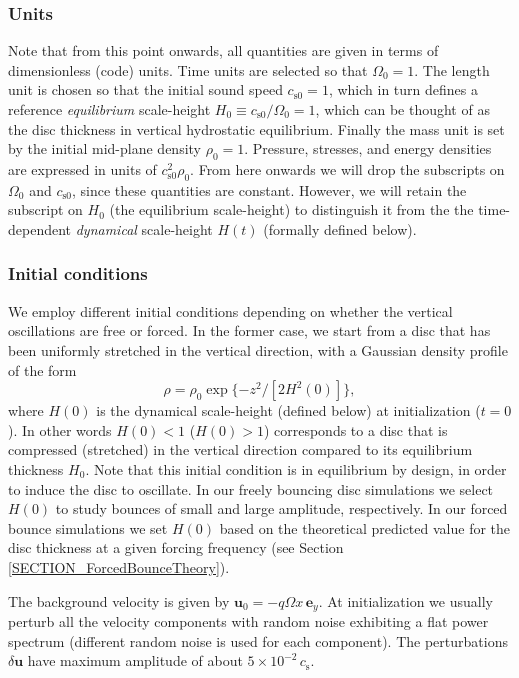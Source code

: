 \documentclass[fleqn,usenatbib]{mnras}
\begin{document}
\subsubsection{Units}
\label{METHODS_Units}
Note that from this point onwards, all quantities are given in terms of dimensionless (code) units. Time units are selected so that $\Omega_0 = 1$. The length unit is chosen so that the initial sound speed $c_{\text{s}0} = 1$, which in turn defines a reference \textit{equilibrium} scale-height $H_0\equiv c_{\text{s}0} / \Omega_0=1$, which can be thought of as the disc thickness in vertical hydrostatic equilibrium. Finally the mass unit is set by the initial mid-plane density $\rho_0 = 1$. Pressure, stresses, and energy densities are expressed in units of $c_{\text{s}0}^2 \rho_0$. From here onwards we will drop the subscripts on $\Omega_0$ and $c_{\text{s}0}$, since these quantities are constant. However, we will retain the subscript on $H_0$ (the equilibrium scale-height) to distinguish it from the the time-dependent \textit{dynamical} scale-height $H(t)$ (formally defined below).

\subsubsection{Initial conditions}
\label{METHODS_InitialConditions}
We employ different initial conditions depending on whether the vertical oscillations are free or forced. In the former case, we start from a disc that has been uniformly stretched in the vertical direction, with a Gaussian density profile of the form
\begin{equation}
\rho = \rho_0 \exp{\{-z^2/[2H^2(0)]\}},
\label{EQUN_densityprofile}
\end{equation}
where $H(0)$ is the dynamical scale-height (defined below) at initialization ($t=0$). In other words $H(0)<1$ ($H(0)>1$) corresponds to a disc that is compressed (stretched) in the vertical direction compared to its equilibrium thickness $H_0$. Note that this initial condition is  in equilibrium by design, in order to induce the disc to oscillate. In our freely bouncing disc simulations we select $H(0)$ to study bounces of small and large amplitude, respectively. In our forced bounce simulations we set $H(0)$ based on the theoretical predicted value for the disc thickness at a given forcing frequency (see Section \ref{SECTION_ForcedBounceTheory}).

The background velocity is given by $\mathbf{u}_0 = -q \Omega x \,\mathbf{e}_y$. At initialization we usually perturb all the velocity components with random noise exhibiting a flat power spectrum (different random noise is used for each component). The perturbations $\delta \mathbf{u}$ have maximum amplitude of about $5\times10^{-2}\,c_\text{s}$.
\end{document}
